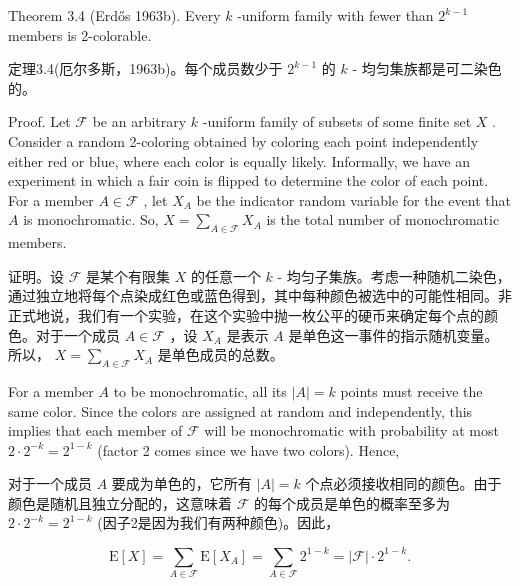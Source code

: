 \documentclass[10pt]{article}
\begin{document}
Theorem 3.4 (Erdős 1963b). Every \(k\) -uniform family with fewer than \({2}^{k - 1}\) members is 2-colorable.

\begin{tcolorbox}\relax
定理3.4(厄尔多斯，1963b)。每个成员数少于 \({2}^{k - 1}\) 的 \(k\) - 均匀集族都是可二染色的。
\end{tcolorbox}

Proof. Let \(\mathcal{F}\) be an arbitrary \(k\) -uniform family of subsets of some finite set \(X\) . Consider a random 2-coloring obtained by coloring each point independently either red or blue, where each color is equally likely. Informally, we have an experiment in which a fair coin is flipped to determine the color of each point. For a member \(A \in  \mathcal{F}\) , let \({X}_{A}\) be the indicator random variable for the event that \(A\) is monochromatic. So, \(X = \mathop{\sum }\limits_{{A \in  \mathcal{F}}}{X}_{A}\) is the total number of monochromatic members.

\begin{tcolorbox}\relax
证明。设 \(\mathcal{F}\) 是某个有限集 \(X\) 的任意一个 \(k\) - 均匀子集族。考虑一种随机二染色，通过独立地将每个点染成红色或蓝色得到，其中每种颜色被选中的可能性相同。非正式地说，我们有一个实验，在这个实验中抛一枚公平的硬币来确定每个点的颜色。对于一个成员 \(A \in  \mathcal{F}\) ，设 \({X}_{A}\) 是表示 \(A\) 是单色这一事件的指示随机变量。所以， \(X = \mathop{\sum }\limits_{{A \in  \mathcal{F}}}{X}_{A}\) 是单色成员的总数。
\end{tcolorbox}

For a member \(A\) to be monochromatic, all its \(\left| A\right|  = k\) points must receive the same color. Since the colors are assigned at random and independently, this implies that each member of \(\mathcal{F}\) will be monochromatic with probability at most \(2 \cdot  {2}^{-k} = {2}^{1 - k}\) (factor 2 comes since we have two colors). Hence,

\begin{tcolorbox}\relax
对于一个成员 \(A\) 要成为单色的，它所有 \(\left| A\right|  = k\) 个点必须接收相同的颜色。由于颜色是随机且独立分配的，这意味着 \(\mathcal{F}\) 的每个成员是单色的概率至多为 \(2 \cdot  {2}^{-k} = {2}^{1 - k}\) (因子2是因为我们有两种颜色)。因此，
\end{tcolorbox}

\[
\mathrm{E}\left\lbrack  X\right\rbrack   = \mathop{\sum }\limits_{{A \in  \mathcal{F}}}\mathrm{E}\left\lbrack  {X}_{A}\right\rbrack   = \mathop{\sum }\limits_{{A \in  \mathcal{F}}}{2}^{1 - k} = \left| \mathcal{F}\right|  \cdot  {2}^{1 - k}.
\]
\end{document}
